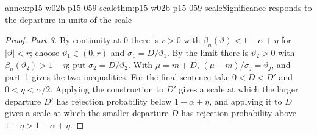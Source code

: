\begin{annexitem}{annex:p15-w02b-p15-059-scale}{thm:p15-w02b-p15-059-scale}{Significance responds to the departure in units of the scale}
\begin{proof}
\emph{Part 3.} By continuity at \(0\) there is \(r>0\) with
\(\beta_n(\vartheta)<1-\alpha+\eta\) for \(|\vartheta|<r\); choose
\(\vartheta_1\in(0,r)\) and \(\sigma_1=D/\vartheta_1\). By the limit there
is \(\vartheta_2>0\) with \(\beta_n(\vartheta_2)>1-\eta\); put
\(\sigma_2=D/\vartheta_2\). With \(\mu=m+D\),
\((\mu-m)/\sigma_j=\vartheta_j\), and part~1 gives the two inequalities.
For the final sentence take \(0<D<D'\) and \(0<\eta<\alpha/2\). Applying
the construction to \(D'\) gives a scale at which the larger departure
\(D'\) has rejection probability below \(1-\alpha+\eta\), and applying it
to \(D\) gives a scale at which the smaller departure \(D\) has rejection
probability above \(1-\eta>1-\alpha+\eta\).
\end{proof}
\end{annexitem}


